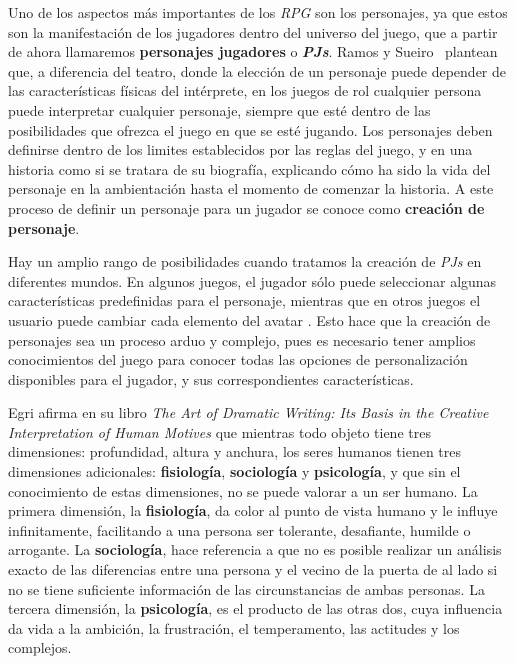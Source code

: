Uno de los aspectos más importantes de los \textit{RPG} son los personajes, ya que estos son la manifestación de los jugadores 
dentro del universo del juego, que a partir de ahora llamaremos \textbf{personajes jugadores} o \textbf{\textit{PJs}}. 
Ramos y Sueiro~\autocite*{Ramos-Villagrasa2010} plantean que, a diferencia del teatro, donde la elección de un personaje puede depender de las características 
físicas del intérprete, en los juegos de rol cualquier persona puede interpretar cualquier personaje, siempre que esté dentro de las 
posibilidades que ofrezca el juego en que se esté jugando. Los personajes deben definirse dentro de los limites establecidos por 
las reglas del juego, y en una historia como si se tratara de su biografía, explicando cómo ha sido la vida del personaje en 
la ambientación hasta el momento de comenzar la historia. A este proceso de definir un personaje 
para un jugador se conoce como \textbf{creación de personaje}. \medskip

Hay un amplio rango de posibilidades cuando tratamos la creación de \textit{PJs} en diferentes mundos. En algunos juegos, el jugador 
sólo puede seleccionar algunas características predefinidas para el personaje, mientras que en otros juegos el usuario puede cambiar cada
elemento del avatar \autocite*{Isaksson2012}. Esto hace que la creación de personajes sea un proceso arduo y complejo, pues es necesario 
tener amplios conocimientos del juego para conocer todas las opciones de personalización disponibles para el jugador, y sus correspondientes 
características. \medskip

Egri \autocite*{Egri1960} afirma en su libro \textit{The Art of Dramatic Writing: Its Basis in the Creative Interpretation 
of Human Motives} que mientras todo objeto tiene tres dimensiones: profundidad, altura y anchura, los seres humanos tienen 
tres dimensiones adicionales: \textbf{fisiología}, \textbf{sociología} y \textbf{psicología}, y que sin el conocimiento de estas dimensiones, no se puede
valorar a un ser humano. La primera dimensión, la \textbf{fisiología}, da color al punto de vista humano y le influye infinitamente, 
facilitando a una persona ser tolerante, desafiante, humilde o arrogante. La \textbf{sociología}, hace referencia a que no es posible 
realizar un análisis exacto de las diferencias entre una persona y el vecino de la puerta de al lado si no se tiene suficiente 
información de las circunstancias de ambas personas. La tercera dimensión, la \textbf{psicología}, es el producto de las otras dos, cuya 
influencia da vida a la ambición, la frustración, el temperamento, las actitudes y los complejos.\medskip

